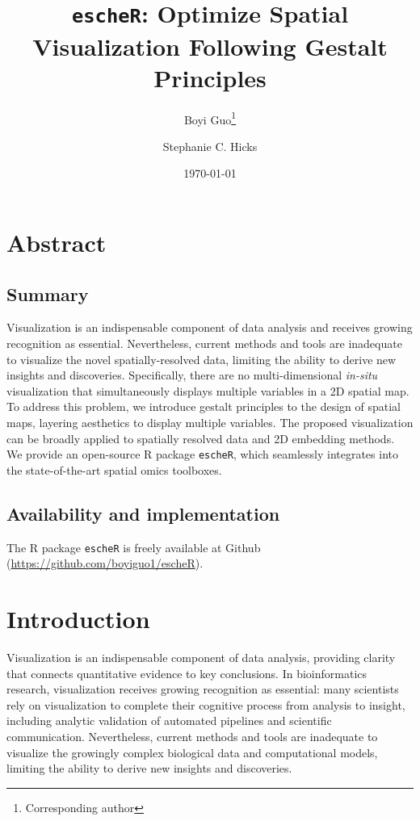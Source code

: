 \documentclass[11pt]{article}
\title{\texttt{escheR}: Optimize Spatial Visualization Following Gestalt Principles}
\author[1]{Boyi Guo\thanks{Corresponding author}}
\author[1]{Stephanie C. Hicks}
\affil[1]{Department of Biostatistics, Johns Hopkins Bloomberg School of Public Health, MD, USA}
\date{\today}
\newcommand{\fixme}[1]{{\color{red} (#1)}}
\begin{document}
\maketitle

\vspace{-.6in}

\section*{Abstract}
\subsection*{Summary}
Visualization is an indispensable component of data analysis and receives growing recognition as essential. Nevertheless, current methods and
tools are inadequate to visualize the novel spatially-resolved data, limiting the ability to derive new insights and discoveries. Specifically, there are no multi-dimensional \textit{in-situ} visualization that simultaneously displays multiple variables in a 2D spatial map. To address this problem, we introduce gestalt principles to the design of spatial maps, layering aesthetics to display multiple variables. The proposed visualization can be broadly applied to spatially resolved data and 2D embedding methods. We provide an open-source R package \texttt{escheR}, which seamlessly integrates into the state-of-the-art spatial omics toolboxes.

\subsection*{Availability and implementation}
The R package \texttt{escheR} is freely available at Github (\url{https://github.com/boyiguo1/escheR}).


\section*{Introduction}
Visualization is an indispensable component of data analysis, providing clarity that connects quantitative evidence to key conclusions.\cite{dagostinomcgowan_2022} In bioinformatics research, visualization receives growing recognition as essential: many scientists rely on visualization to complete their cognitive process from analysis to insight, including analytic validation of automated pipelines and scientific communication.\cite{odonoghue_2021} Nevertheless, current methods and tools are inadequate to visualize the growingly complex biological data and computational models, limiting the ability to derive new insights and discoveries.\cite{odonoghue_2010}  
\end{document}
